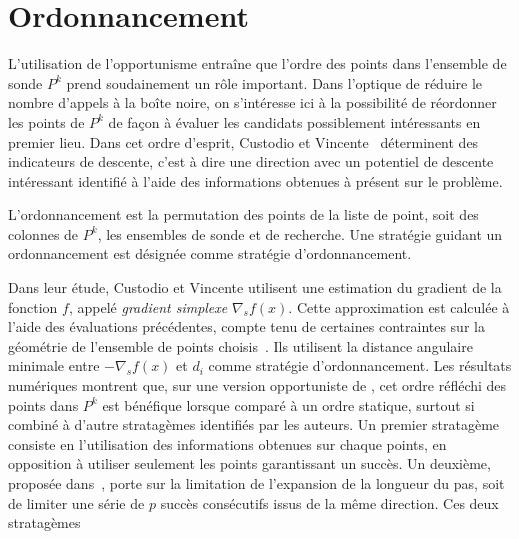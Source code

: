 \section{Ordonnancement}\label{sec:ord}
L'utilisation de l'opportunisme entraîne que l'ordre des points dans l'ensemble de sonde $P^k$ prend soudainement un rôle important. Dans l'optique de réduire le nombre d'appels à la boîte noire, on s'intéresse ici à la possibilité de réordonner les points de $P^k$ de façon à évaluer les candidats possiblement intéressants en premier lieu. Dans cet ordre d'esprit, Custodio et Vincente~\cite{CuVi07} déterminent des indicateurs de descente, c'est à dire une direction avec un potentiel de descente intéressant identifié à l'aide des informations obtenues à présent sur le problème. 
\begin{definition}[Ordonnancement]\label{def:ordo}
	L'ordonnancement est la permutation des points de la liste de point, soit des colonnes de $P^k$, les ensembles de sonde et de recherche. Une stratégie guidant un ordonnancement est désignée comme stratégie d'ordonnancement.
\end{definition}
Dans leur étude, Custodio et Vincente utilisent une estimation du gradient de la fonction $f$, appelé \emph{gradient simplexe} $\nabla_sf(x)$. Cette approximation est calculée à l'aide des évaluations précédentes, compte tenu de certaines contraintes sur la géométrie de l'ensemble de points choisis~\cite{CoScVi2006}. Ils utilisent la distance angulaire minimale entre $-\nabla_{s}f(x)$ et $d_i$ comme stratégie d'ordonnancement. Les résultats numériques montrent que, sur une version opportuniste de \CS, cet ordre réfléchi des points dans $P^k$ est bénéfique lorsque comparé à un ordre statique, surtout si combiné à d'autre stratagèmes identifiés par les auteurs. Un premier stratagème consiste en l'utilisation des informations obtenues sur chaque points, en opposition à utiliser seulement les points garantissant un succès. Un deuxième, proposée dans~\cite{HoKoTo01a}, porte sur la limitation de l'expansion de la longueur du pas, soit de limiter une série de $p$ succès consécutifs issus de la même direction. Ces deux stratagèmes
